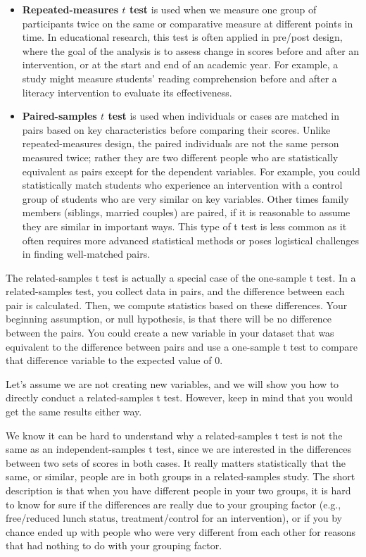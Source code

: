\documentclass[
  letterpaper,
  DIV=11,
  numbers=noendperiod]{scrreprt}
\begin{document}
\begin{itemize}
\item
  \textbf{Repeated-measures \(t\) test} is used when we measure one
  group of participants twice on the same or comparative measure at
  different points in time. In educational research, this test is often
  applied in pre/post design, where the goal of the analysis is to
  assess change in scores before and after an intervention, or at the
  start and end of an academic year. For example, a study might measure
  students' reading comprehension before and after a literacy
  intervention to evaluate its effectiveness.
\item
  \textbf{Paired-samples \(t\) test} is used when individuals or cases
  are matched in pairs based on key characteristics before comparing
  their scores. Unlike repeated-measures design, the paired individuals
  are not the same person measured twice; rather they are two different
  people who are statistically equivalent as pairs except for the
  dependent variables. For example, you could statistically match
  students who experience an intervention with a control group of
  students who are very similar on key variables. Other times family
  members (siblings, married couples) are paired, if it is reasonable to
  assume they are similar in important ways. This type of t test is less
  common as it often requires more advanced statistical methods or poses
  logistical challenges in finding well-matched pairs.
\end{itemize}

The related-samples t test is actually a special case of the one-sample
t test. In a related-samples test, you collect data in pairs, and the
difference between each pair is calculated. Then, we compute statistics
based on these differences. Your beginning assumption, or null
hypothesis, is that there will be no difference between the pairs. You
could create a new variable in your dataset that was equivalent to the
difference between pairs and use a one-sample t test to compare that
difference variable to the expected value of 0.

Let's assume we are not creating new variables, and we will show you how
to directly conduct a related-samples t test. However, keep in mind that
you would get the same results either way.

We know it can be hard to understand why a related-samples t test is not
the same as an independent-samples t test, since we are interested in
the differences between two sets of scores in both cases. It really
matters statistically that the same, or similar, people are in both
groups in a related-samples study. The short description is that when
you have different people in your two groups, it is hard to know for
sure if the differences are really due to your grouping factor (e.g.,
free/reduced lunch status, treatment/control for an intervention), or if
you by chance ended up with people who were very different from each
other for reasons that had nothing to do with your grouping factor.
\end{document}
